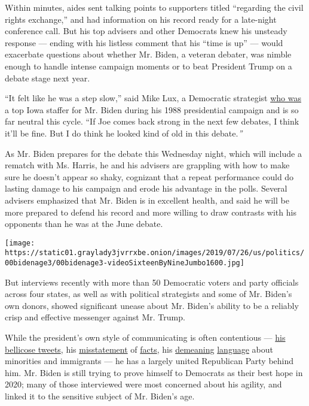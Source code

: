 Within minutes, aides sent talking points to supporters titled
``regarding the civil rights exchange,'' and had information on his
record ready for a late-night conference call. But his top advisers and
other Democrats knew his unsteady response --- ending with his listless
comment that his ``time is up'' --- would exacerbate questions about
whether Mr. Biden, a veteran debater, was nimble enough to handle
intense campaign moments or to beat President Trump on a debate stage
next year.

``It felt like he was a step slow,'' said Mike Lux, a Democratic
strategist
\href{https://www.nytimes3xbfgragh.onion/2019/06/03/us/politics/biden-1988-presidential-campaign.html}{who
was} a top Iowa staffer for Mr. Biden during his 1988 presidential
campaign and is so far neutral this cycle. ``If Joe comes back strong in
the next few debates, I think it'll be fine. But I do think he looked
kind of old in this debate.\emph{''}

As Mr. Biden prepares for the debate this Wednesday night, which will
include a rematch with Ms. Harris, he and his advisers are grappling
with how to make sure he doesn't appear so shaky, cognizant that a
repeat performance could do lasting damage to his campaign and erode his
advantage in the polls. Several advisers emphasized that Mr. Biden is in
excellent health, and said he will be more prepared to defend his record
and more willing to draw contrasts with his opponents than he was at the
June debate.

\texttt{[image: https://static01.graylady3jvrrxbe.onion/images/2019/07/26/us/politics/00bidenage3/00bidenage3-videoSixteenByNineJumbo1600.jpg]}

But interviews recently with more than 50 Democratic voters and party
officials across four states, as well as with political strategists and
some of Mr. Biden's own donors, showed significant unease about Mr.
Biden's ability to be a reliably crisp and effective messenger against
Mr. Trump.

While the president's own style of communicating is often contentious
---
\href{https://www.nytimes3xbfgragh.onion/2019/07/16/us/politics/trump-tweet-house-vote.html}{his
bellicose tweets}, his
\href{https://www.nytimes3xbfgragh.onion/2019/07/15/us/politics/trump-fact-check-ilhan-omar.html}{misstatement}
of
\href{https://www.nytimes3xbfgragh.onion/2019/07/08/us/politics/trump-environmental-record-fact-check.html}{facts},
his
\href{https://www.nytimes3xbfgragh.onion/2019/07/27/us/politics/trump-elijah-cummings.html}{demeaning}
\href{https://www.nytimes3xbfgragh.onion/2019/07/20/us/politics/trump-race-record.html}{language}
about minorities and immigrants --- he has a largely united Republican
Party behind him. Mr. Biden is still trying to prove himself to
Democrats as their best hope in 2020; many of those interviewed were
most concerned about his agility, and linked it to the sensitive subject
of Mr. Biden's age.

